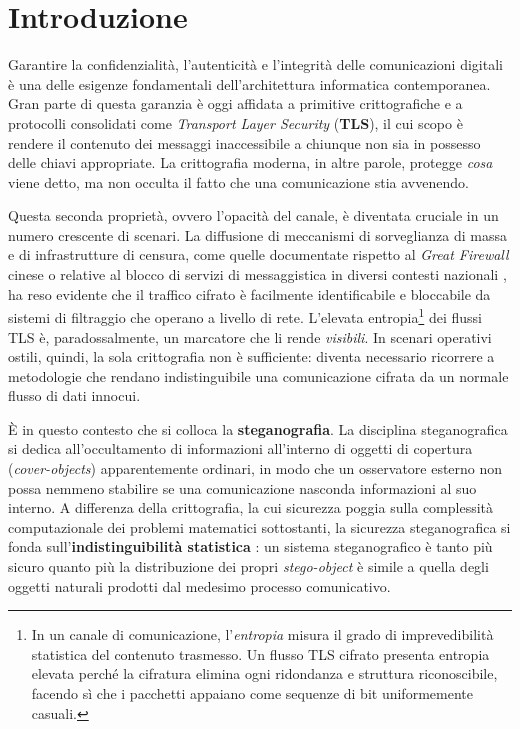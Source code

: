 
\chapter{Introduzione}\label{ch:introduzione}

Garantire la confidenzialità, l'autenticità e l'integrità delle comunicazioni digitali è una delle esigenze fondamentali dell'architettura informatica contemporanea. Gran parte di questa garanzia è oggi affidata a primitive crittografiche e a protocolli consolidati come \emph{Transport Layer Security} (\textbf{TLS}), il cui scopo è rendere il contenuto dei messaggi inaccessibile a chiunque non sia in possesso delle chiavi appropriate. La crittografia moderna, in altre parole, protegge \emph{cosa} viene detto, ma non occulta il fatto che una comunicazione stia avvenendo.

Questa seconda proprietà, ovvero l'opacità del canale, è diventata cruciale in un numero crescente di scenari. La diffusione di meccanismi di sorveglianza di massa e di infrastrutture di censura, come quelle documentate rispetto al \emph{Great Firewall} cinese \cite{chinawall-2015} o relative al blocco di servizi di messaggistica in diversi contesti nazionali \cite{conger-2016, sablah-2025}, ha reso evidente che il traffico cifrato è facilmente identificabile e bloccabile da sistemi di filtraggio che operano a livello di rete. L'elevata entropia\footnote{In un canale di comunicazione, l'\emph{entropia} misura il grado di imprevedibilità statistica del contenuto trasmesso. Un flusso TLS cifrato presenta entropia elevata perché la cifratura elimina ogni ridondanza e struttura riconoscibile, facendo sì che i pacchetti appaiano come sequenze di bit uniformemente casuali.} dei flussi TLS è, paradossalmente, un marcatore che li rende \emph{visibili}. In scenari operativi ostili, quindi, la sola crittografia non è sufficiente: diventa necessario ricorrere a metodologie che rendano indistinguibile una comunicazione cifrata da un normale flusso di dati innocui.

È in questo contesto che si colloca la \textbf{steganografia}. La disciplina steganografica si dedica all'occultamento di informazioni all'interno di oggetti di copertura (\emph{cover-objects}) apparentemente ordinari, in modo che un osservatore esterno non possa nemmeno stabilire se una comunicazione nasconda informazioni al suo interno. A differenza della crittografia, la cui sicurezza poggia sulla complessità computazionale dei problemi matematici sottostanti, la sicurezza steganografica si fonda sull'\textbf{indistinguibilità statistica} \cite{turch-2020}: un sistema steganografico è tanto più sicuro quanto più la distribuzione dei propri \emph{stego-object} è simile a quella degli oggetti naturali prodotti dal medesimo processo comunicativo.


